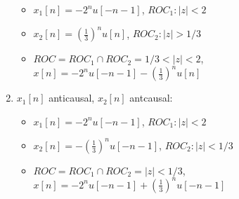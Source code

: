 \documentclass{article}
\begin{document}
\begin{description}
\begin{enumerate}
\begin{itemize}
\item $\displaystyle x_1[n]=- 2^n u[-n-1]$, $ROC_1: |z| < 2$
\item $\displaystyle x_2[n]=\left(\frac{1}{3}\right)^n u[n]$, $ROC_2: |z| > 1/3$
\item $\displaystyle ROC = ROC_1 \cap ROC_2 = 1/3 < |z| < 2$, $\qquad$ $x[n]=- 2^n u[-n-1]-(\frac{1}{3})^n u[n]$
\end{itemize}
\item $x_1[n]$ anticausal, $x_2[n]$ antcausal:
\begin{itemize}
\item $\displaystyle x_1[n]=- 2^n u[-n-1]$, $ROC_1: |z| < 2$
\item $\displaystyle x_2[n]=- \left(\frac{1}{3}\right)^n u[-n-1]$, $ROC_2: |z| < 1/3$
\item $\displaystyle ROC = ROC_1 \cap ROC_2 = |z| < 1/3$, $\qquad$ $x[n]=- 2^n u[-n-1]+(\frac{1}{3})^n u[-n-1]$
\end{itemize}
\end{enumerate}
\end{description}
\end{document}
